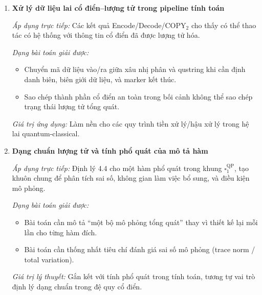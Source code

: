 \documentclass[12pt,a4paper]{article}
\begin{document}
\begin{enumerate}[leftmargin=*,itemsep=0.9em]
\textit{Dạng bài toán giải được:}
\begin{itemize}[leftmargin=1.5em]
\item Bài toán cần chứng minh tương đương giữa hai hệ hình thức để đảm bảo tính đúng của mô hình.
\item Bài toán cần quản lý ``garbage'' và khôi phục thông tin trong tính toán khả nghịch từng phần.
\end{itemize}

\textit{Giá trị thực hành nghiên cứu:} Làm rõ ``cơ chế nội bộ'' của phép mô phỏng thay vì chỉ đưa kết quả đến-thêm.

\item \textbf{Xử lý dữ liệu lai cổ điển--lượng tử trong pipeline tính toán}

\textit{Áp dụng trực tiếp:} Các kết quả Encode/Decode/$\mathrm{COPY}_2$ cho thấy có thể thao tác có hệ thống với thông tin cổ điển đã được lượng tử hóa.

\textit{Dạng bài toán giải được:}
\begin{itemize}[leftmargin=1.5em]
\item Chuyển mã dữ liệu vào/ra giữa xâu nhị phân và qustring khi cần định danh biên, biên giới dữ liệu, và marker kết thúc.
\item Sao chép thành phần cổ điển an toàn trong bối cảnh không thể sao chép trạng thái lượng tử tổng quát.
\end{itemize}

\textit{Giá trị ứng dụng:} Làm nền cho các quy trình tiền xử lý/hậu xử lý trong hệ lai quantum-classical.

\item \textbf{Dạng chuẩn lượng tử và tính phổ quát của mô tả hàm}

\textit{Áp dụng trực tiếp:} Định lý 4.4 cho một hàm phổ quát trong khung $\square_{1}^{\mathrm{QP}}$, tạo khuôn chung để phân tích sai số, không gian làm việc bổ sung, và điều kiện mô phỏng.

\textit{Dạng bài toán giải được:}
\begin{itemize}[leftmargin=1.5em]
\item Bài toán cần mô tả ``một bộ mô phỏng tổng quát'' thay vì thiết kế lại mỗi lần cho từng hàm đích.
\item Bài toán cần thống nhất tiêu chí đánh giá sai số mô phỏng (trace norm / total variation).
\end{itemize}

\textit{Giá trị lý thuyết:} Gắn kết với tính phổ quát trong tính toán, tương tự vai trò định lý dạng chuẩn trong đệ quy cổ điển.


\end{enumerate}
\end{document}
